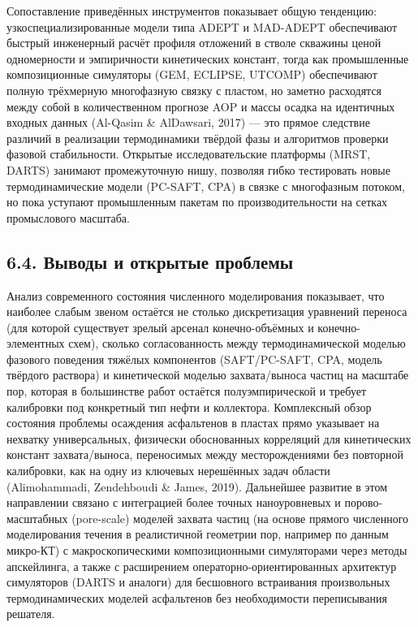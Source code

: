 \documentclass[11pt]{extarticle}
\begin{document}
Сопоставление приведённых инструментов показывает общую тенденцию: узкоспециализированные модели типа ADEPT и MAD-ADEPT обеспечивают быстрый инженерный расчёт профиля отложений в стволе скважины ценой одномерности и эмпиричности кинетических констант, тогда как промышленные композиционные симуляторы (GEM, ECLIPSE, UTCOMP) обеспечивают полную трёхмерную многофазную связку с пластом, но заметно расходятся между собой в количественном прогнозе AOP и массы осадка на идентичных входных данных (Al-Qasim \& AlDawsari, 2017) --- это прямое следствие различий в реализации термодинамики твёрдой фазы и алгоритмов проверки фазовой стабильности. Открытые исследовательские платформы (MRST, DARTS) занимают промежуточную нишу, позволяя гибко тестировать новые термодинамические модели (PC-SAFT, CPA) в связке с многофазным потоком, но пока уступают промышленным пакетам по производительности на сетках промыслового масштаба.

\subsection{6.4. Выводы и открытые проблемы}\label{ux432ux44bux432ux43eux434ux44b-ux438-ux43eux442ux43aux440ux44bux442ux44bux435-ux43fux440ux43eux431ux43bux435ux43cux44b}

Анализ современного состояния численного моделирования показывает, что наиболее слабым звеном остаётся не столько дискретизация уравнений переноса (для которой существует зрелый арсенал конечно-объёмных и конечно-элементных схем), сколько согласованность между термодинамической моделью фазового поведения тяжёлых компонентов (SAFT/PC-SAFT, CPA, модель твёрдого раствора) и кинетической моделью захвата/выноса частиц на масштабе пор, которая в большинстве работ остаётся полуэмпирической и требует калибровки под конкретный тип нефти и коллектора. Комплексный обзор состояния проблемы осаждения асфальтенов в пластах прямо указывает на нехватку универсальных, физически обоснованных корреляций для кинетических констант захвата/выноса, переносимых между месторождениями без повторной калибровки, как на одну из ключевых нерешённых задач области (Alimohammadi, Zendehboudi \& James, 2019). Дальнейшее развитие в этом направлении связано с интеграцией более точных наноуровневых и порово-масштабных (pore-scale) моделей захвата частиц (на основе прямого численного моделирования течения в реалистичной геометрии пор, например по данным микро-КТ) с макроскопическими композиционными симуляторами через методы апскейлинга, а также с расширением операторно-ориентированных архитектур симуляторов (DARTS и аналоги) для бесшовного встраивания произвольных термодинамических моделей асфальтенов без необходимости переписывания решателя.
\end{document}
